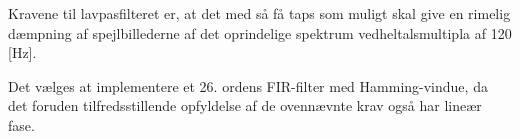 Kravene til lavpasfilteret er, at det med så få taps
som muligt skal give en rimelig dæmpning af
spejlbillederne af det oprindelige spektrum vedheltalsmultipla af 120 [Hz].

Det vælges at implementere et 26. ordens FIR-filter med Hamming-vindue, da det foruden tilfredsstillende opfyldelse
af de ovennævnte krav også har lineær fase.
